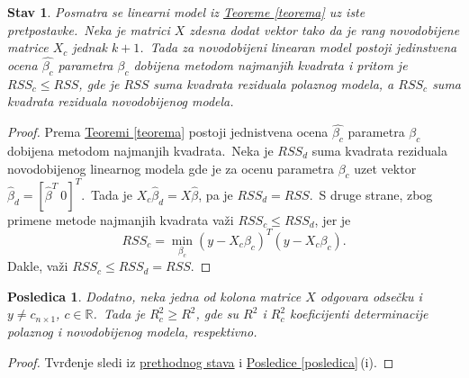 \documentclass[12pt,a4paper,titlepage,oneside]{article}
\numberwithin{equation}{section}
\numberwithin{figure}{section}
\numberwithin{table}{section}
\newtheorem{stav}[thm]{Stav}
\newtheorem{posl}[thm]{Posledica}
\theoremstyle{definition}
\theoremstyle{remark}
\begin{document}
\begin{appendices}
\begin{stav}\label{stav}
	Posmatra se linearni model iz \hyperref[teorema]{Teoreme \ref*{teorema}} uz iste pretpostavke.\ Neka je matrici $X$ zdesna dodat vektor tako da je rang novodobijene matrice $X_c$ jednak $k + 1$.\ Tada za novodobijeni linearan model postoji jedinstvena ocena $\hat{\beta_c}$ parametra $\beta_c$ dobijena metodom najmanjih kvadrata i pritom je $RSS_c \leqslant RSS$, gde je $RSS$ suma kvadrata reziduala polaznog modela, a $RSS_c$ suma kvadrata reziduala novodobijenog modela.
\end{stav}

\begin{proof}
	Prema \hyperref[teorema]{Teoremi \ref*{teorema}} postoji jednistvena ocena $\hat{\beta_c}$ parametra $\beta_c$ dobijena metodom najmanjih kvadrata.\ Neka je $RSS_d$ suma kvadrata reziduala novodobijenog linearnog modela gde je za ocenu parametra $\beta_c$ uzet\! vektor $\hat{\beta}_d = [\hat{\beta}^T ~0]^T$.\ Tada je $X_c \hat{\beta}_d = X\hat{\beta}$, pa je $RSS_d = RSS$.\ S druge strane, zbog primene metode najmanjih kvadrata važi $RSS_c \leqslant RSS_d$, jer je \[RSS_c = \min_{\beta_c} (y - X_c \beta_c)^T (y - X_c \beta_c).\] Dakle, važi $RSS_c \leqslant RSS_d = RSS$.
\end{proof}

\begin{posl}\label{R2}
	Dodatno, neka jedna od kolona matrice $X$ odgovara odsečku i $y\neq c_{n\times 1}$, $c\in \mathbb{R}$.\ Tada je $R^2_c \geqslant R^2$, gde su $R^2$ i $R^2_c$ koeficijenti determinacije polaznog i novodobijenog modela, respektivno.
\end{posl}

\begin{proof}
	Tvrđenje sledi iz \hyperref[stav]{prethodnog stava} i \hyperref[posledica]{Posledice \ref*{posledica}}\,(i).
\end{proof}

\end{appendices}

\clearpage

\thispagestyle{empty}

{}
\end{document}
